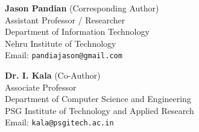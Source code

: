\documentclass[10pt]{article}
\begin{document}
\vspace{0.1cm}

\begin{minipage}[t]{0.48\textwidth}
  \textbf{Jason Pandian} (Corresponding Author) \\
  Assistant Professor / Researcher \\
  Department of Information Technology \\
  Nehru Institute of Technology \\
  Email: \texttt{pandiajason@gmail.com}
\end{minipage}\hfill
\begin{minipage}[t]{0.48\textwidth}
  \textbf{Dr. I. Kala} (Co-Author) \\
  Associate Professor \\
  Department of Computer Science and Engineering \\
  PSG Institute of Technology and Applied Research \\
  Email: \texttt{kala@psgitech.ac.in}
\end{minipage}
\end{document}
